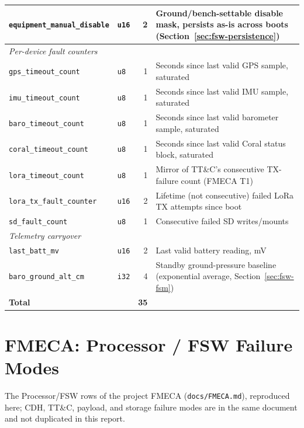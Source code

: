 \begin{longtable}{@{}llr p{6.0cm}@{}}
\texttt{equipment\_manual\_disable} & \texttt{u16} & 2 & Ground/bench-settable disable mask, persists as-is across boots (Section~\ref{sec:fsw-persistence}) \\
\midrule
\multicolumn{4}{l}{\textit{Per-device fault counters}}\\
\texttt{gps\_timeout\_count}       & \texttt{u8}  & 1 & Seconds since last valid GPS sample, saturated \\
\texttt{imu\_timeout\_count}       & \texttt{u8}  & 1 & Seconds since last valid IMU sample, saturated \\
\texttt{baro\_timeout\_count}      & \texttt{u8}  & 1 & Seconds since last valid barometer sample, saturated \\
\texttt{coral\_timeout\_count}     & \texttt{u8}  & 1 & Seconds since last valid Coral status block, saturated \\
\texttt{lora\_timeout\_count}      & \texttt{u8}  & 1 & Mirror of TT\&C's consecutive TX-failure count (FMECA T1) \\
\texttt{lora\_tx\_fault\_counter}  & \texttt{u16} & 2 & Lifetime (not consecutive) failed LoRa TX attempts since boot \\
\texttt{sd\_fault\_count}          & \texttt{u8}  & 1 & Consecutive failed SD writes/mounts \\
\midrule
\multicolumn{4}{l}{\textit{Telemetry carryover}}\\
\texttt{last\_batt\_mv}            & \texttt{u16} & 2 & Last valid battery reading, mV \\
\texttt{baro\_ground\_alt\_cm}     & \texttt{i32} & 4 & Standby ground-pressure baseline (exponential average, Section~\ref{sec:fsw-fsm}) \\
\midrule
\textbf{Total}                     &              & \textbf{35} & \\
\bottomrule
\end{longtable}

\section{FMECA: Processor / FSW Failure Modes}

The Processor/FSW rows of the project FMECA (\texttt{docs/FMECA.md}),
reproduced here; CDH, TT\&C, payload, and storage failure modes are in the
same document and not duplicated in this report.

